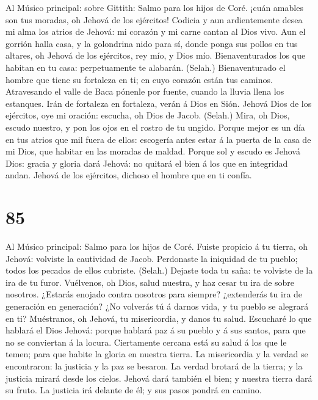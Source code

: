  Al Músico principal: sobre Gittith: Salmo para los hijos
de Coré. ¡cuán amables son tus moradas, oh Jehová de los ejércitos!
 Codicia y aun ardientemente desea mi alma los atrios de
Jehová: mi corazón y mi carne cantan al Dios vivo.  Aun el
gorrión halla casa, y la golondrina nido para sí, donde ponga sus pollos
en tus altares, oh Jehová de los ejércitos, rey mío, y Dios mío.
 Bienaventurados los que habitan en tu casa: perpetuamente
te alabarán. (Selah.)  Bienaventurado el hombre que tiene
su fortaleza en ti; en cuyo corazón están tus caminos. 
Atravesando el valle de Baca pónenle por fuente, cuando la lluvia llena
los estanques.  Irán de fortaleza en fortaleza, verán á
Dios en Sión.  Jehová Dios de los ejércitos, oye mi
oración: escucha, oh Dios de Jacob. (Selah.)  Mira, oh
Dios, escudo nuestro, y pon los ojos en el rostro de tu ungido.
 Porque mejor es un día en tus atrios que mil fuera de
ellos: escogería antes estar á la puerta de la casa de mi Dios, que
habitar en las moradas de maldad.  Porque sol y escudo es
Jehová Dios: gracia y gloria dará Jehová: no quitará el bien á los que
en integridad andan.  Jehová de los ejércitos, dichoso el
hombre que en ti confía.

\hypertarget{section-84}{%
\section{85}\label{section-84}}

 Al Músico principal: Salmo para los hijos de Coré. Fuiste
propicio á tu tierra, oh Jehová: volviste la cautividad de Jacob.
 Perdonaste la iniquidad de tu pueblo; todos los pecados
de ellos cubriste. (Selah.)  Dejaste toda tu saña: te
volviste de la ira de tu furor.  Vuélvenos, oh Dios, salud
nuestra, y haz cesar tu ira de sobre nosotros.  ¿Estarás
enojado contra nosotros para siempre? ¿extenderás tu ira de generación
en generación?  ¿No volverás tú á darnos vida, y tu pueblo
se alegrará en ti?  Muéstranos, oh Jehová, tu
misericordia, y danos tu salud.  Escucharé lo que hablará
el Dios Jehová: porque hablará paz á su pueblo y á sus santos, para que
no se conviertan á la locura.  Ciertamente cercana está su
salud á los que le temen; para que habite la gloria en nuestra tierra.
 La misericordia y la verdad se encontraron: la justicia
y la paz se besaron.  La verdad brotará de la tierra; y
la justicia mirará desde los cielos.  Jehová dará también
el bien; y nuestra tierra dará su fruto.  La justicia irá
delante de él; y sus pasos pondrá en camino.

